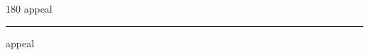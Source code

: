 
\begin{frame}
\begin{center}
\begin{turn}{180}
{\fontsize{2.5cm}{1em}\selectfont appeal}
\end{turn}
\vspace{1em}\par  
\hrule
\vspace{1em}\par  
{\fontsize{2.5cm}{1em}\selectfont appeal}
\end{center}
\end{frame}
